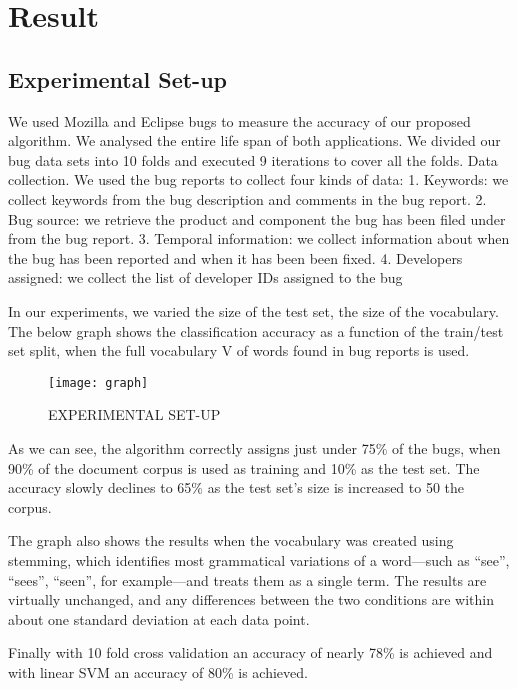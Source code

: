 
\chapter{Result} %
\label{Chapter7}

\section{Experimental Set-up}
We used Mozilla and Eclipse bugs to measure the accuracy of our proposed
algorithm. We analysed the entire life span of both applications.  We divided our bug data sets into 10 folds and executed 9 iterations to cover all the folds.
Data collection. We used the bug reports to collect four kinds of data:
1. Keywords: we collect keywords from the bug description and
comments in the bug report.
2. Bug source: we retrieve the product and component the bug has been filed
under from the bug report.
3. Temporal information: we collect information about when the bug has
been reported and when it has been been fixed.
4. Developers assigned: we collect the list of developer IDs assigned to the bug

In our experiments, we varied the size of the test set, the
size of the vocabulary. The below graph shows the classification accuracy as a function of the train/test set split, when the full vocabulary
V of words found in bug reports is used.

\begin{figure}[hbt]
\begin{center}
\texttt{[image: graph]}
\caption{EXPERIMENTAL SET-UP}
\end{center}
\end{figure}


As we can see, the algorithm correctly assigns just under
75\% of the bugs, when 90\% of the document corpus is used
as training and 10\% as the test set. The accuracy slowly
declines to 65\% as the test set’s size is increased to 50%
the corpus. 
\newline 

The graph also shows the results when the vocabulary was created using stemming, which identifies most grammatical variations of a word—such as “see”, “sees”, “seen”, for example—and treats them as a single term. The results are virtually unchanged, and any differences between the two conditions are within about one standard deviation at each data point.

Finally with 10 fold cross validation an accuracy of nearly 78\% is achieved and with linear SVM an accuracy of 80\% is achieved.